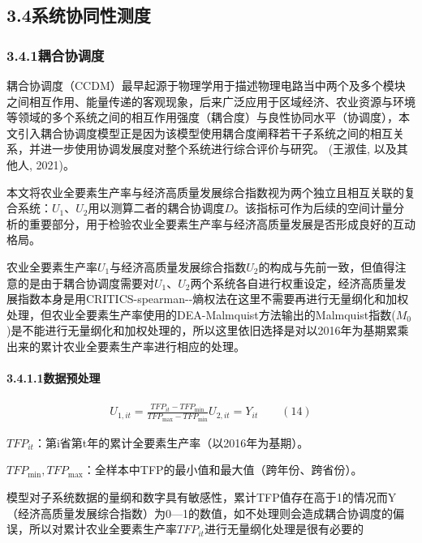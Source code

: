 \documentclass[UTF8,a4paper,12pt,fontset=windows]{ctexart}
\begin{document}
\subsection{3.4系统协同性测度}\label{ux7cfbux7edfux534fux540cux6027ux6d4bux5ea6}

\subsubsection{3.4.1耦合协调度}\label{ux8026ux5408ux534fux8c03ux5ea6}

耦合协调度（CCDM）最早起源于物理学用于描述物理电路当中两个及多个模块之间相互作用、能量传递的客观现象，后来广泛应用于区域经济、农业资源与环境等领域的多个系统之间的相互作用强度（耦合度）与良性协同水平（协调度），本文引入耦合协调度模型正是因为该模型使用耦合度阐释若干子系统之间的相互关系，并进一步使用协调发展度对整个系统进行综合评价与研究。 (王淑佳, 以及其他人, 2021)。

本文将农业全要素生产率与经济高质量发展综合指数视为两个独立且相互关联的复合系统：\(U_{1}\)、\(U_{2}\)用以测算二者的耦合协调度\(D\)。该指标可作为后续的空间计量分析的重要部分，用于检验农业全要素生产率与经济高质量发展是否形成良好的互动格局。

农业全要素生产率\(U_{1}\)与经济高质量发展综合指数\(U_{2}\)的构成与先前一致，但值得注意的是由于耦合协调度需要对\(U_{1}\)、\(U_{2}\)两个系统各自进行权重设定，经济高质量发展指数本身是用CRITICS-spearman-\/-熵权法在这里不需要再进行无量纲化和加权处理，但农业全要素生产率使用的DEA-Malmquist方法输出的Malmquist指数(\(M_{0}\))是不能进行无量纲化和加权处理的，所以这里依旧选择是对以2016年为基期累乘出来的累计农业全要素生产率进行相应的处理。

\paragraph{3.4.1.1数据预处理}\label{ux6570ux636eux9884ux5904ux7406}

\[\begin{array}{r}
U_{1,it} = \frac{TFP_{it} - TFP_{\min}}{TFP_{\max} - TFP_{\min}}U_{2,it} = Y_{it}\qquad(14)
\end{array}\]

\noindent \(TFP_{it}\)：第i省第t年的累计全要素生产率（以2016年为基期）。

\noindent \(TFP_{\min},TFP_{\max}\)：全样本中TFP的最小值和最大值（跨年份、跨省份）。

模型对子系统数据的量纲和数字具有敏感性，累计TFP值存在高于1的情况而Y（经济高质量发展综合指数）为0---1的数值，如不处理则会造成耦合协调度的偏误，所以对累计农业全要素生产率\(TFP_{it}\)进行无量纲化处理是很有必要的
\end{document}
